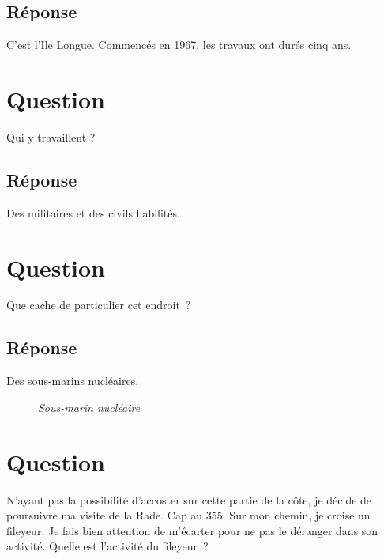\documentclass[12pt, report]{article}
\begin{document}
\subsection*{Réponse}
C'est l'Ile Longue. Commencés en 1967, les travaux ont durés cinq ans.

\section{Question}
Qui y travaillent ?
\subsection*{Réponse}
Des militaires et des civils habilités.

\section{Question}
Que cache de particulier cet endroit ? 
\subsection*{Réponse}
Des sous-marins nucléaires.
\begin{center}
\begin{figure}[ht]
\caption{\textit{Sous-marin nucléaire}}
\end{figure}
\end{center}

\section{Question}
N’ayant pas la possibilité d’accoster sur cette partie de la côte, je décide de poursuivre ma visite de la Rade. Cap au 355. Sur mon chemin, je croise un fileyeur. Je fais bien attention de m’écarter pour ne pas le déranger dans son activité. Quelle est l’activité du fileyeur ?
\end{document}
